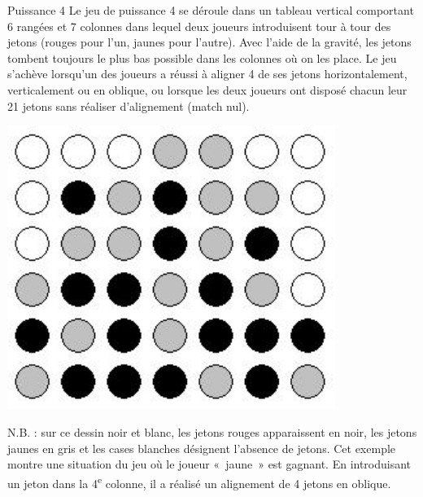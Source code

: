 \begin{Exercice}{Puissance 4}
	Le jeu de puissance 4 se déroule dans un tableau vertical comportant 6
	rangées et 7 colonnes dans lequel deux joueurs introduisent tour à tour
	des jetons (rouges pour l’un, jaunes pour l’autre). Avec l’aide de la
	gravité, les jetons tombent toujours le plus bas possible dans les
	colonnes où on les place. Le jeu s’achève lorsqu’un des joueurs a
	réussi à aligner 4 de ses jetons horizontalement, verticalement ou en
	oblique, ou lorsque les deux joueurs ont disposé chacun leur 21 jetons
	sans réaliser d’alignement (match nul).


	
		\begin{minipage}[t][][b]{4cm}
		\includegraphics[width=0.8\textwidth]{image/puissance4}
		\end{minipage}
		\begin{minipage}[t][][b]{10cm}
		N.B. : sur ce dessin noir et
		blanc, les jetons rouges apparaissent en noir, les jetons jaunes en
		gris et les cases blanches désignent l'absence de
		jetons. Cet exemple montre une situation du jeu où le joueur «~jaune~»
		est gagnant. En introduisant un jeton dans la
		4\textsuperscript{e} colonne,
		il a réalisé un alignement de 4 jetons en oblique.
		\end{minipage}


\end{Exercice}
